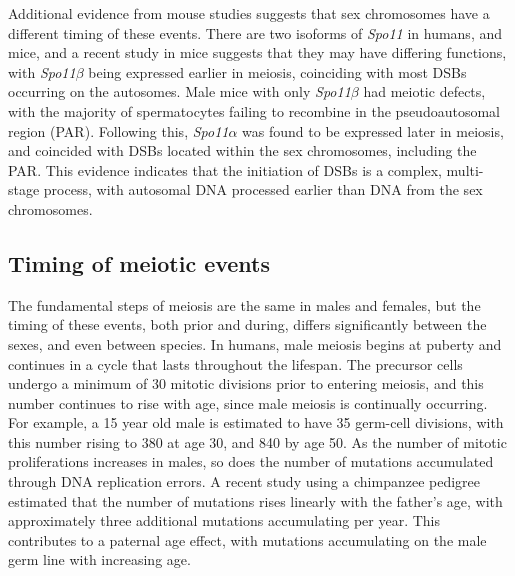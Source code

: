 Additional evidence from mouse studies suggests that sex chromosomes have a different timing of these events.
There are two isoforms of \textit{Spo11} in humans, and mice, and a recent study in mice suggests that they may have differing functions, with \textit{Spo11$\beta$} being expressed earlier in meiosis, coinciding with most DSBs occurring on the autosomes.
Male mice with only \textit{Spo11$\beta$} had meiotic defects, with the majority of spermatocytes failing to recombine in the pseudoautosomal region (PAR)\cite{Kauppi2011}.
Following this, \textit{Spo11$\alpha$} was found to be expressed later in meiosis, and coincided with DSBs located within the sex chromosomes, including the PAR\cite{Kauppi2011,DeMassy2013}.
This evidence indicates that the initiation of DSBs is a complex, multi-stage process, with autosomal DNA processed earlier than DNA from the sex chromosomes.



\subsection{Timing of meiotic events}

The fundamental steps of meiosis are the same in males and females, but the timing of these events, both prior and during, differs significantly between the sexes\cite{Lynn2004}, and even between species.
In humans, male meiosis begins at puberty and continues in a cycle that lasts throughout the lifespan.
The precursor cells undergo a minimum of 30 mitotic divisions prior to entering meiosis, and this number continues to rise with age, since male meiosis is continually occurring.
For example, a 15 year old male is estimated to have 35 germ-cell divisions, with this number rising to 380 at age 30, and 840 by age 50\cite{Crow2000a}.
As the number of mitotic proliferations increases in males, so does the number of mutations accumulated through DNA replication errors.
A recent study using a chimpanzee pedigree estimated that the number of mutations rises linearly with the father's age, with approximately three additional mutations accumulating per year\cite{Venn2014}.
This contributes to a paternal age effect, with mutations accumulating on the male germ line with increasing age.

